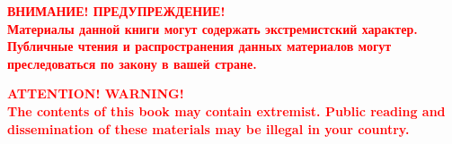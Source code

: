\pagecolor{black}
\vspace*{\fill}
\begin{center}
\textbf{\textcolor{red}{\Large\MakeUppercase{Внимание! Предупреждение!}\large\\
Материалы данной книги могут содержать экстремистский характер. 
Публичные чтения и распространения данных материалов могут преследоваться по закону в вашей стране.}}\\
\vspace*{2cm}

\textbf{\textcolor{red}{\Large\uppercase{Attention! Warning!}\large\\
The contents of this book may contain extremist.
Public reading and dissemination of these materials may be illegal in your country.}}
\end{center}
\vspace*{\fill}
\pagecolor{white}